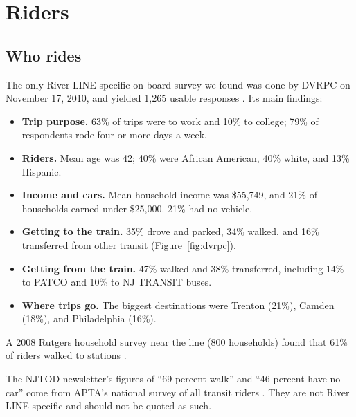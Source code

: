 \documentclass[11pt]{article}
\begin{document}
\section{Riders}\label{sec:riders}
\subsection{Who rides}
The only River LINE-specific on-board survey we found was done by DVRPC on November 17, 2010, and yielded 1{,}265 usable responses \citep{dvrpc2013}. Its main findings:
\begin{itemize}
\item \textbf{Trip purpose.} 63\% of trips were to work and 10\% to college; 79\% of respondents rode four or more days a week.
\item \textbf{Riders.} Mean age was 42; 40\% were African American, 40\% white, and 13\% Hispanic.
\item \textbf{Income and cars.} Mean household income was \$55{,}749, and 21\% of households earned under \$25{,}000. 21\% had no vehicle.
\item \textbf{Getting to the train.} 35\% drove and parked, 34\% walked, and 16\% transferred from other transit (Figure~\ref{fig:dvrpc}).
\item \textbf{Getting from the train.} 47\% walked and 38\% transferred, including 14\% to PATCO and 10\% to NJ TRANSIT buses.
\item \textbf{Where trips go.} The biggest destinations were Trenton (21\%), Camden (18\%), and Philadelphia (16\%).
\end{itemize}
A 2008 Rutgers household survey near the line (800 households) found that 61\% of riders walked to stations \citep{chatman2010}.

The NJTOD newsletter's figures of ``69 percent walk'' and ``46 percent have no car'' \citep{njtod2026} come from APTA's national survey of all transit riders \citep{apta2017who}. They are not River LINE-specific and should not be quoted as such.
\end{document}
